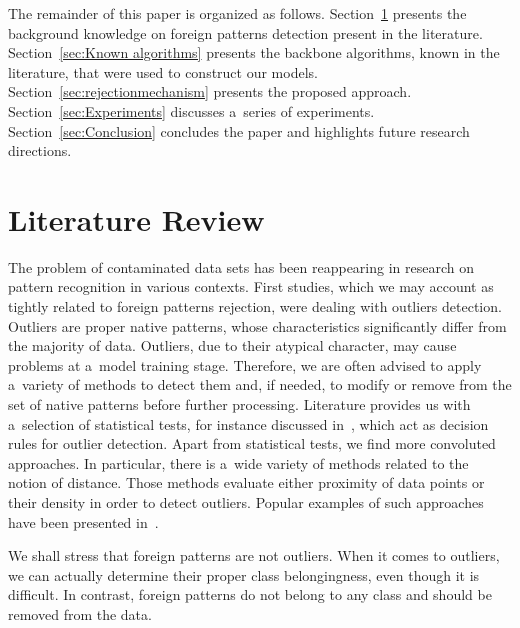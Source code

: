 \documentclass{llncs}
\begin{document}
The remainder of this paper is organized as follows. Section~\ref{sec:Literature Review} presents the background knowledge on foreign patterns detection present in the literature. Section~\ref{sec:Known algorithms} presents the backbone algorithms, known in the literature, that were used to construct our models. Section~\ref{sec:rejectionmechanism} presents the proposed approach. Section~\ref{sec:Experiments} discusses a~series of experiments. Section~\ref{sec:Conclusion} concludes the paper and highlights future research directions.
\vspace{-3pt}

\section{Literature Review}
  \label{sec:Literature Review}
The problem of contaminated data sets has been reappearing in research on pattern recognition in various contexts. First studies, which we may account as tightly related to foreign patterns rejection, were dealing with outliers detection. Outliers are proper native patterns, whose characteristics significantly differ from the majority of data. Outliers, due to their atypical character, may cause problems at a~model training stage. Therefore, we are often advised to apply a~variety of methods to detect them and, if needed, to modify or remove from the set of native patterns before further processing. Literature provides us with a~selection of statistical tests, for instance discussed in~\cite{Grubbs1950,Tukey1977}, which act as decision rules for outlier detection. Apart from statistical tests, we find more convoluted approaches. In particular, there is a~wide variety of methods related to the notion of distance. Those methods evaluate either proximity of data points or their density in order to detect outliers. Popular examples of such approaches have been presented in~\cite{BreunigKriegelNgSander1999,KnorrNg1999}.

We shall stress that foreign patterns are not outliers. When it comes to outliers, we can actually determine their proper class belongingness, even though it is difficult. In contrast, foreign patterns do not belong to any class and should be removed from the data. 
\end{document}
